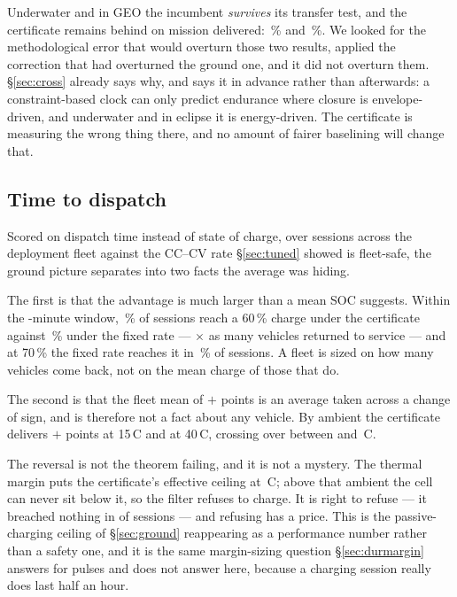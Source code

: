 \documentclass[11pt,letterpaper]{article}
\theoremstyle{definition}
\theoremstyle{remark}
\newcommand{\SI}[2]{#1\,#2}
\newcommand{\degreeCelsius}{\degC}
\newcommand{\degC}{\ifmmode{^\circ}\mathrm{C}\else\textdegree C\fi}
\begin{document}
Underwater and in GEO the incumbent \emph{survives} its transfer test, and the certificate
remains behind on mission delivered: \tWaterGain\,\% and \tSpaceGain\,\%. We looked for the
methodological error that would overturn those two results, applied the correction that had
overturned the ground one, and it did not overturn them. \S\ref{sec:cross} already says why, and
says it in advance rather than afterwards: a constraint-based clock can only predict endurance
where closure is envelope-driven, and underwater and in eclipse it is energy-driven. The
certificate is measuring the wrong thing there, and no amount of fairer baselining will change
that.

\subsection{Time to dispatch}

Scored on dispatch time instead of state of charge, over \gtTrials{} sessions across the
deployment fleet against the CC--CV rate \S\ref{sec:tuned} showed is fleet-safe, the ground
picture separates into two facts the average was hiding.

The first is that the advantage is much larger than a mean SOC suggests. Within the
\gtWindow-minute window, \gtReachSixtyZg\,\% of sessions reach a 60\,\% charge under the certificate
against \gtReachSixtyCc\,\% under the fixed rate --- \gtReachSixtyRatio$\times$ as many vehicles
returned to service --- and at 70\,\% the fixed rate reaches it in \gtReachSeventyCc\,\% of sessions.
A fleet is sized on how many vehicles come back, not on the mean charge of those that do.

The second is that the fleet mean of $+$\gtMean{} points is an average taken across a change of
sign, and is therefore not a fact about any vehicle. By ambient the certificate delivers
$+$\gtAmbFifteen{} points at \SI{15}{\degreeCelsius} and \gtAmbForty{} at \SI{40}{\degreeCelsius}, crossing over between
\gtCrossLo{} and \SI{\gtCrossHi}{\degreeCelsius}.

The reversal is not the theorem failing, and it is not a mystery. The thermal margin puts the
certificate's effective ceiling at \SI{\gtCeiling}{\degreeCelsius}; above that ambient the cell can never sit
below it, so the filter refuses to charge. It is right to refuse --- it breached nothing in
\gtViol{} of \gtTrials{} sessions --- and refusing has a price. This is the passive-charging
ceiling of \S\ref{sec:ground} reappearing as a performance number rather than a safety one, and
it is the same margin-sizing question \S\ref{sec:durmargin} answers for pulses and does not
answer here, because a charging session really does last half an hour.
\end{document}
